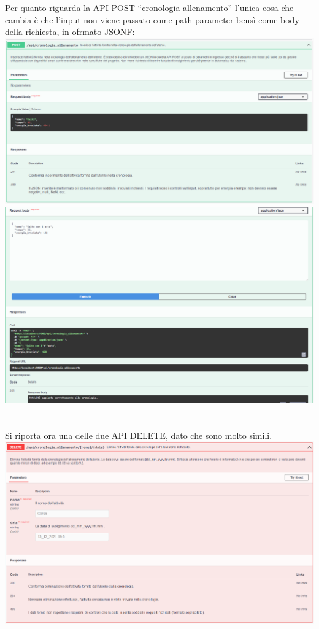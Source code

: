 \documentclass{article}
\begin{document}
   Per quanto riguarda la API POST “cronologia allenamento” l’unica cosa che cambia è che l’input non viene passato come path parameter bensì come body della richiesta, in ofrmato JSONF:\\
   \includegraphics[scale=0.5]{doc post cronologia_allenamento.png}\\
   \includegraphics[scale=0.5]{risposta post cronologia_allenamento.png}\\
   \\
   \\
   Si riporta ora una delle due API DELETE, dato che sono molto simili.\\
   \includegraphics[scale=0.5]{doc delete cronologia_allenamento.png}\\
\end{document}
